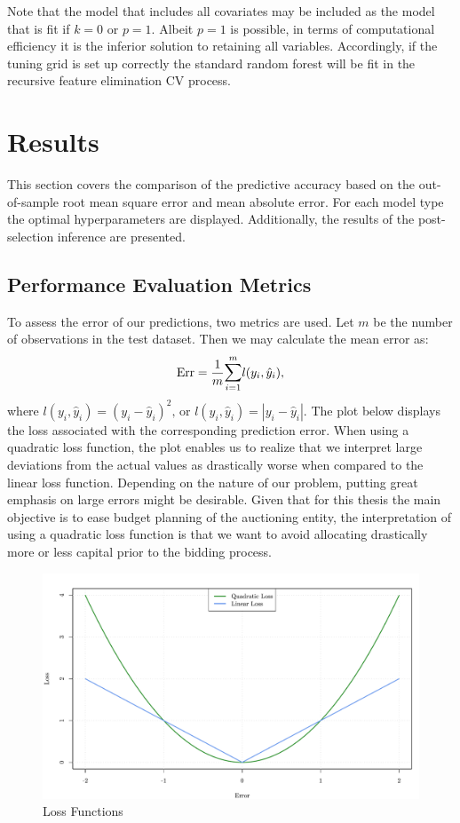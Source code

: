 \documentclass[a4paper,12pt, headsepline]{scrartcl}
\numberwithin{equation}{section}
\begin{document}
Note that the model that includes all covariates may be included  as the model that is fit if $k = 0$ or $p = 1$. Albeit $p = 1$ is possible, in terms of computational efficiency it is the inferior solution to retaining all variables. Accordingly, if the tuning grid is set up correctly the standard random forest will be fit in the recursive feature elimination CV process. 
\newpage
\section{Results}\label{sec:res}
This section covers the comparison of the predictive accuracy based on the out-of-sample root mean square error and mean absolute error. For each model type the optimal hyperparameters are displayed. Additionally, the results of the post-selection inference are presented.

\subsection{Performance Evaluation Metrics}\label{subsec:per}
To assess the error of our predictions, two metrics are used. Let $m$ be the number of observations in the test dataset. Then we may calculate the mean error as:
\[
\text{Err} = \frac{1}{m} \mathlarger{\sum}\limits_{i = 1}^{m} l(y_i, \hat y_i),
\]
where $l(y_i, \hat y_i) =( y_i - \hat y_i)^2 \text{, or } l(y_i, \hat y_i) = |y_i - \hat y_i|$. The plot below displays the loss associated with the corresponding prediction error. When using a quadratic loss function, the plot enables us to realize that we interpret large deviations from the actual values as drastically worse when compared to the linear loss function. Depending on the nature of our problem, putting great emphasis on large errors might be desirable. Given that for this thesis the main objective is to ease budget planning of the auctioning entity, the interpretation of using a quadratic loss function is that we want to avoid allocating drastically more or less capital prior to the bidding process.
\begin{figure}[H]
	\includegraphics[width = 13.5	cm]{figures/Lossfun.pdf}
	\caption{Loss Functions}\label{fig:lossfun}
\end{figure}
\end{document}
